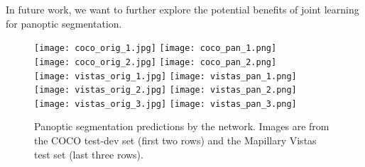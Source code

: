 \documentclass[10pt,twocolumn,letterpaper]{article}
\begin{document}
In future work, we want to further explore the potential benefits of joint learning for panoptic segmentation.

\begin{figure}[t]
\centering
\texttt{[image: coco\_orig\_1.jpg]}
\texttt{[image: coco\_pan\_1.png]}\\
\texttt{[image: coco\_orig\_2.jpg]}
\texttt{[image: coco\_pan\_2.png]}\\
\texttt{[image: vistas\_orig\_1.jpg]}
\texttt{[image: vistas\_pan\_1.png]}\\
\texttt{[image: vistas\_orig\_2.jpg]}
\texttt{[image: vistas\_pan\_2.png]}\\
\texttt{[image: vistas\_orig\_3.jpg]}
\texttt{[image: vistas\_pan\_3.png]}
\caption{Panoptic segmentation predictions by the network. Images are from the COCO test-dev set (first two rows) and the Mapillary Vistas test set (last three rows).} \label{fig:more_example_images}
\end{figure}

{\small


}
\end{document}
